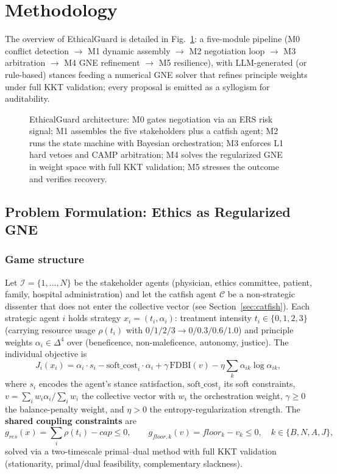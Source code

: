 \documentclass[11pt]{article}
\begin{document}
\section{Methodology}
The overview of EthicalGuard is detailed in Fig.~\ref{fig:arch}: a five-module
pipeline (M0 conflict detection $\to$ M1 dynamic assembly $\to$ M2 negotiation
loop $\to$ M3 arbitration $\to$ M4 GNE refinement $\to$ M5 resilience), with
LLM-generated (or rule-based) stances feeding a numerical GNE solver that
refines principle weights under full KKT validation; every proposal is emitted
as a syllogism for auditability.
\begin{figure}[t]
  \centering
  \caption{EthicalGuard architecture: M0 gates negotiation via an ERS risk
  signal; M1 assembles the five stakeholders plus a catfish agent; M2 runs the
  state machine with Bayesian orchestration; M3 enforces L1 hard vetoes and
  CAMP arbitration; M4 solves the regularized GNE in weight space with full
  KKT validation; M5 stresses the outcome and verifies recovery.}
  \label{fig:arch}
\end{figure}

\subsection{Problem Formulation: Ethics as Regularized GNE}
\label{sec:formulation}
\subsubsection{Game structure}
Let $\mathcal{I} = \{1,\dots,N\}$ be the stakeholder agents (physician,
ethics committee, patient, family, hospital administration) and let the
catfish agent $\mathcal{C}$ be a non-strategic dissenter that does not enter
the collective vector (see Section~\ref{sec:catfish}). Each strategic agent
$i$ holds strategy $x_i = (t_i, \alpha_i)$: treatment intensity
$t_i \in \{0,1,2,3\}$ (carrying resource usage $\rho(t_i)$ with
$0/1/2/3 \to 0/0.3/0.6/1.0$) and principle weights
$\alpha_i \in \Delta^4$ over (beneficence, non-maleficence, autonomy,
justice). The individual objective is
\begin{equation}
  J_i(x_i) = \alpha_i \cdot s_i - \mathrm{soft\_cost}_i \cdot \alpha_i
  + \gamma\,\mathrm{FDBI}(v) - \eta \sum_{k} \alpha_{ik}\log\alpha_{ik},
  \label{eq:Ji}
\end{equation}
where $s_i$ encodes the agent's stance satisfaction, $\mathrm{soft\_cost}_i$
its soft constraints, $v = \sum_i w_i \alpha_i / \sum_i w_i$ the collective
vector with $w_i$ the orchestration weight, $\gamma\ge0$ the balance-penalty
weight, and $\eta>0$ the entropy-regularization strength. The
\textbf{shared coupling constraints} are
\begin{equation}
  g_{res}(x) = \sum_{i} \rho(t_i) - cap \le 0,
  \qquad
  g_{floor,k}(v) = floor_k - v_k \le 0, \quad k \in \{B,N,A,J\},
  \label{eq:constraints}
\end{equation}
solved via a two-timescale primal--dual method with full KKT validation
(stationarity, primal/dual feasibility, complementary slackness).
\end{document}
